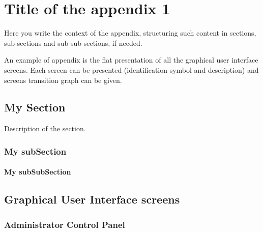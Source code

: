 \chapter{Title of the appendix 1}
\label{chap:appendix1}


Here you write the context of the appendix, structuring such content in
sections, sub-sections and sub-sub-sections, if needed.

An example of appendix is the flat presentation of all the graphical user interface screens.
Each screen can be presented (identification symbol and description) and screens transition graph can be given.


\section{My Section}
\label{sec:appendix1_mySection}
Description of the section.



\subsection{My subSection}

\subsubsection{My subSubSection}


\section{Graphical User Interface screens}

\subsection{Administrator Control Panel}

